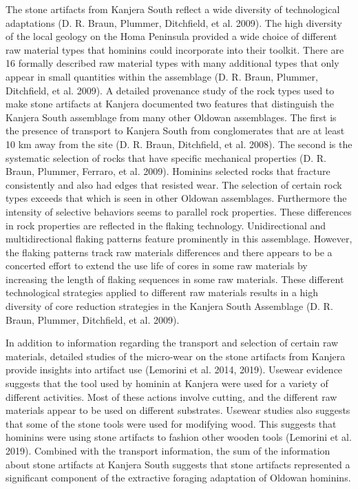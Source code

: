 \documentclass[]{elsarticle} %
\begin{document}
The stone artifacts from Kanjera South reflect a wide diversity of
technological adaptations (D. R. Braun, Plummer, Ditchfield, et al.
2009). The high diversity of the local geology on the Homa Peninsula
provided a wide choice of different raw material types that hominins
could incorporate into their toolkit. There are 16 formally described
raw material types with many additional types that only appear in small
quantities within the assemblage (D. R. Braun, Plummer, Ditchfield, et
al. 2009). A detailed provenance study of the rock types used to make
stone artifacts at Kanjera documented two features that distinguish the
Kanjera South assemblage from many other Oldowan assemblages. The first
is the presence of transport to Kanjera South from conglomerates that
are at least 10 km away from the site (D. R. Braun, Ditchfield, et al.
2008). The second is the systematic selection of rocks that have
specific mechanical properties (D. R. Braun, Plummer, Ferraro, et al.
2009). Hominins selected rocks that fracture consistently and also had
edges that resisted wear. The selection of certain rock types exceeds
that which is seen in other Oldowan assemblages. Furthermore the
intensity of selective behaviors seems to parallel rock properties.
These differences in rock properties are reflected in the flaking
technology. Unidirectional and multidirectional flaking patterns feature
prominently in this assemblage. However, the flaking patterns track raw
materials differences and there appears to be a concerted effort to
extend the use life of cores in some raw materials by increasing the
length of flaking sequences in some raw materials. These different
technological strategies applied to different raw materials results in a
high diversity of core reduction strategies in the Kanjera South
Assemblage (D. R. Braun, Plummer, Ditchfield, et al. 2009).

In addition to information regarding the transport and selection of
certain raw materials, detailed studies of the micro-wear on the stone
artifacts from Kanjera provide insights into artifact use (Lemorini et
al. 2014, 2019). Usewear evidence suggests that the tool used by hominin
at Kanjera were used for a variety of different activities. Most of
these actions involve cutting, and the different raw materials appear to
be used on different substrates. Usewear studies also suggests that some
of the stone tools were used for modifying wood. This suggests that
hominins were using stone artifacts to fashion other wooden tools
(Lemorini et al. 2019). Combined with the transport information, the sum
of the information about stone artifacts at Kanjera South suggests that
stone artifacts represented a significant component of the extractive
foraging adaptation of Oldowan hominins.
\end{document}
